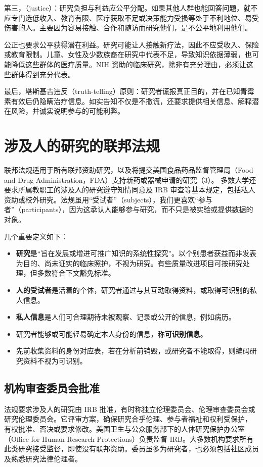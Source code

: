 第三，（justice）：研究负担与利益应公平分配。如果其他人群也能回答问题，就不应专门选低收入、教育有限、医疗获取不足或决策能力受损等处于不利地位、易受伤害的人。主要因为容易接触、合作和随访而研究他们，是不公平地利用他们。

公正也要求公平获得潜在利益。研究可能让人接触新疗法，因此不应受收入、保险或教育限制。儿童、女性及少数族裔在研究中代表不足，导致知识依据薄弱，也可能降低这些群体的医疗质量。NIH 资助的临床研究，除非有充分理由，必须让这些群体得到充分代表。

最后，塔斯基吉违反（truth-telling）原则：研究者谎报真正目的，并在已知青霉素有效后仍隐瞒治疗信息。如实告知不仅是不撒谎，还要求提供相关信息、解释潜在风险，并诚实说明参与的可能利弊。

\section{涉及人的研究的联邦法规}
联邦法规适用于所有联邦资助研究，以及将提交美国食品药品监督管理局（Food and Drug Administration，FDA）支持新药或器械申请的研究（3）。
多数大学还要求所属教职工的涉及人的研究遵守知情同意及 IRB 审查等基本规定，包括私人资助或校外研究。法规虽用“受试者”（subjects），我们更喜欢“参与者”（participants），因为这承认人能够参与研究，而不只是被实验或提供数据的对象。

几个重要定义如下：
\begin{itemize}
\item \textbf{研究}是“旨在发展或增进可推广知识的系统性探究”。以个别患者获益而非发表为目的、尚未证实的临床照护，不视为研究。有些质量改进项目可按研究处理，但多数符合下文豁免标准。
\item \textbf{人的受试者}是活着的个体，研究者通过与其互动取得资料，或取得可识别的私人信息。
\item \textbf{私人信息}是人们可合理期待未被观察、记录或公开的信息，例如病历。
\item 研究者能够或可能轻易确定本人身份的信息，称\textbf{可识别信息}。
\item 先前收集资料的身份对应表，若在分析前销毁，或研究者不能取得，则编码研究资料不视为可识别。
\end{itemize}

\subsection{机构审查委员会批准}
法规要求涉及人的研究由 IRB 批准，有时称独立伦理委员会、伦理审查委员会或研究伦理委员会。它评审方案，确保研究合乎伦理、参与者福祉和权利受保护，
有权批准、否决或要求修改。美国卫生与公众服务部下的人体研究保护办公室（Office for Human Research Protections）负责监督 IRB。大多数机构要求所有此类研究接受监督，即使没有联邦资助。委员虽多为研究者，也必须包括社区成员及熟悉研究法律伦理者。

